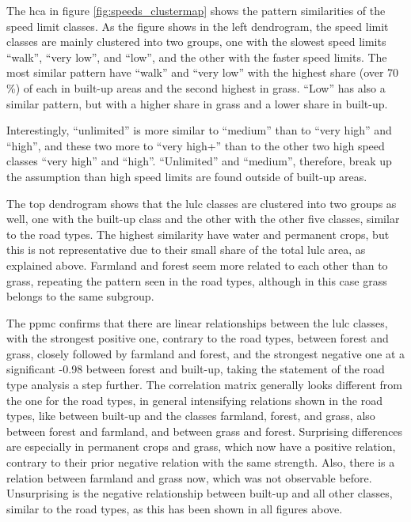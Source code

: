 The \gls{hca} in figure \ref{fig:speeds_clustermap} shows the pattern similarities of the speed limit classes. As the figure shows in the left dendrogram, the speed limit classes are mainly clustered into two groups, one with the slowest speed limits \enquote{walk}, \enquote{very low}, and \enquote{low}, and the other with the faster speed limits. The most similar pattern have \enquote{walk} and \enquote{very low} with the highest share (over 70 \%) of each in built-up areas and the second highest in grass. \enquote{Low} has also a similar pattern, but with a higher share in grass and a lower share in built-up.

Interestingly, \enquote{unlimited} is more similar to \enquote{medium} than to \enquote{very high} and \enquote{high}, and these two more to \enquote{very high+} than to the other two high speed classes \enquote{very high} and \enquote{high}. \enquote{Unlimited} and \enquote{medium}, therefore, break up the assumption than high speed limits are found outside of built-up areas.

The top dendrogram shows that the \gls{lulc} classes are clustered into two groups as well, one with the built-up class and the other with the other five classes, similar to the road types. The highest similarity have water and permanent crops, but this is not representative due to their small share of the total \gls{lulc} area, as explained above. Farmland and forest seem more related to each other than to grass, repeating the pattern seen in the road types, although in this case grass belongs to the same subgroup.

The \gls{ppmc} confirms that there are linear relationships between the \gls{lulc} classes, with the strongest positive one, contrary to the road types, between forest and grass, closely followed by farmland and forest, and the strongest negative one at a significant -0.98 between forest and built-up, taking the statement of the road type analysis a step further. The correlation matrix generally looks different from the one for the road types, in general intensifying relations shown in the road types, like between built-up and the classes farmland, forest, and grass, also between forest and farmland, and between grass and forest. Surprising differences are especially in permanent crops and grass, which now have a positive relation, contrary to their prior negative relation with the same strength. Also, there is a relation between farmland and grass now, which was not observable before. Unsurprising is the negative relationship between built-up and all other classes, similar to the road types, as this has been shown in all figures above.

